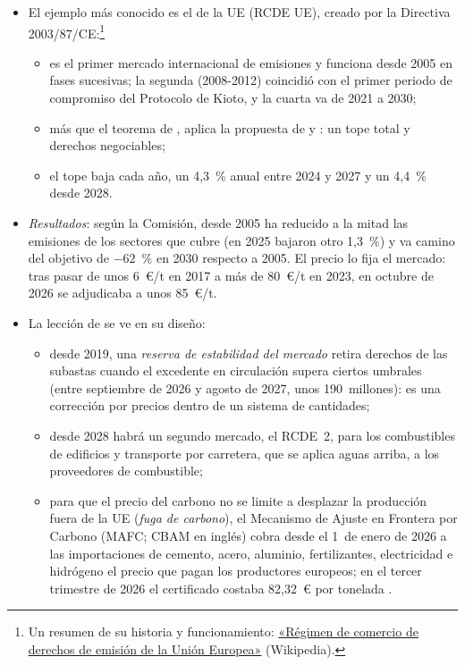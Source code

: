 \documentclass[11pt]{article}
\begin{document}
\begin{itemize}
\item El ejemplo más conocido es el  de la UE (RCDE UE), creado por la Directiva 2003/87/CE\nocite{UE2003Directiva87}:\footnote{Un resumen de su historia y funcionamiento: \href{https://es.wikipedia.org/wiki/R\%C3\%A9gimen_de_comercio_de_derechos_de_emisi\%C3\%B3n_de_la_Uni\%C3\%B3n_Europea}{«Régimen de comercio de derechos de emisión de la Unión Europea»} (Wikipedia).}
  \begin{itemize}
  \item es el primer mercado internacional de emisiones y funciona desde 2005 en fases sucesivas; la segunda (2008-2012) coincidió con el primer periodo de compromiso del Protocolo de Kioto, y la cuarta va de 2021 a 2030\nocite{CE2026DesarrolloETS};
  \item más que el teorema de , aplica la propuesta de  y : un tope total y derechos negociables;
  \item el tope baja cada año, un 4,3~\% anual entre 2024 y 2027 y un 4,4~\% desde 2028\nocite{CE2025TopeETS}.
  \end{itemize}
\item \emph{Resultados}: según la Comisión, desde 2005 ha reducido a la mitad las emisiones de los sectores que cubre (en 2025 bajaron otro 1,3~\%) y va camino del objetivo de $-62$~\% en 2030 respecto a 2005\nocite{CE2026EmisionesETS2025}. El precio lo fija el mercado: tras pasar de unos 6~€/t en 2017 a más de 80~€/t en 2023, en octubre de 2026 se adjudicaba a unos 85~€/t\nocite{EEX2026Subastas}.
\item La lección de  se ve en su diseño:
  \begin{itemize}
  \item desde 2019, una \emph{reserva de estabilidad del mercado} retira derechos de las subastas cuando el excedente en circulación supera ciertos umbrales (entre septiembre de 2026 y agosto de 2027, unos 190~millones)\nocite{CE2026TNAC}: es una corrección por precios dentro de un sistema de cantidades;
  \item desde 2028 habrá un segundo mercado, el RCDE~2, para los combustibles de edificios y transporte por carretera, que se aplica aguas arriba, a los proveedores de combustible\nocite{UE2026Reglamento667,CE2026ETS2};
  \item para que el precio del carbono no se limite a desplazar la producción fuera de la UE (\emph{fuga de carbono}), el Mecanismo de Ajuste en Frontera por Carbono (MAFC; CBAM en inglés) cobra desde el 1~de enero de 2026 a las importaciones de cemento, acero, aluminio, fertilizantes, electricidad e hidrógeno el precio que pagan los productores europeos\nocite{UE2023Reglamento956}; en el tercer trimestre de 2026 el certificado costaba 82,32~€ por tonelada\nocite{CE2026PrecioCBAM} .
  \end{itemize}
\end{itemize}
\end{document}
